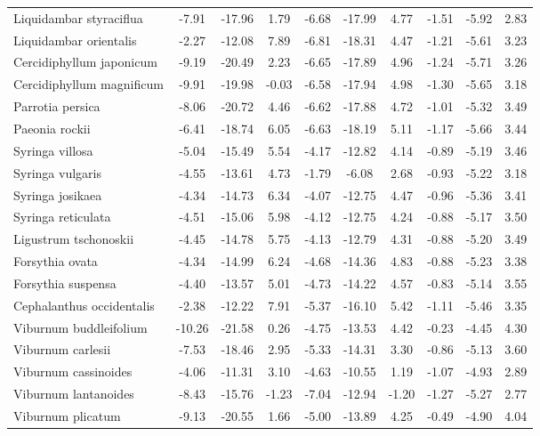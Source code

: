 \documentclass[11pt]{article}
\begin{document}
\begin{longtable}{p{1.50in}c{0.32in}c{0.32in}c{0.32in}c{0.32in}c{0.32in}c{0.32in}c{0.2in}c{0.3in}c{0.1in}}
  Liquidambar styraciflua & -7.91 & -17.96 & 1.79 & -6.68 & -17.99 & 4.77 & -1.51 & -5.92 & 2.83 \\ 
  Liquidambar orientalis & -2.27 & -12.08 & 7.89 & -6.81 & -18.31 & 4.47 & -1.21 & -5.61 & 3.23 \\ 
  Cercidiphyllum japonicum & -9.19 & -20.49 & 2.23 & -6.65 & -17.89 & 4.96 & -1.24 & -5.71 & 3.26 \\ 
  Cercidiphyllum magnificum & -9.91 & -19.98 & -0.03 & -6.58 & -17.94 & 4.98 & -1.30 & -5.65 & 3.18 \\ 
  Parrotia persica & -8.06 & -20.72 & 4.46 & -6.62 & -17.88 & 4.72 & -1.01 & -5.32 & 3.49 \\ 
  Paeonia rockii & -6.41 & -18.74 & 6.05 & -6.63 & -18.19 & 5.11 & -1.17 & -5.66 & 3.44 \\ 
  Syringa villosa & -5.04 & -15.49 & 5.54 & -4.17 & -12.82 & 4.14 & -0.89 & -5.19 & 3.46 \\ 
  Syringa vulgaris & -4.55 & -13.61 & 4.73 & -1.79 & -6.08 & 2.68 & -0.93 & -5.22 & 3.18 \\ 
  Syringa josikaea & -4.34 & -14.73 & 6.34 & -4.07 & -12.75 & 4.47 & -0.96 & -5.36 & 3.41 \\ 
  Syringa reticulata & -4.51 & -15.06 & 5.98 & -4.12 & -12.75 & 4.24 & -0.88 & -5.17 & 3.50 \\ 
  Ligustrum tschonoskii & -4.45 & -14.78 & 5.75 & -4.13 & -12.79 & 4.31 & -0.88 & -5.20 & 3.49 \\ 
  Forsythia ovata & -4.34 & -14.99 & 6.24 & -4.68 & -14.36 & 4.83 & -0.88 & -5.23 & 3.38 \\ 
  Forsythia suspensa & -4.40 & -13.57 & 5.01 & -4.73 & -14.22 & 4.57 & -0.83 & -5.14 & 3.55 \\ 
  Cephalanthus occidentalis & -2.38 & -12.22 & 7.91 & -5.37 & -16.10 & 5.42 & -1.11 & -5.46 & 3.35 \\ 
  Viburnum buddleifolium & -10.26 & -21.58 & 0.26 & -4.75 & -13.53 & 4.42 & -0.23 & -4.45 & 4.30 \\ 
  Viburnum carlesii & -7.53 & -18.46 & 2.95 & -5.33 & -14.31 & 3.30 & -0.86 & -5.13 & 3.60 \\ 
  Viburnum cassinoides & -4.06 & -11.31 & 3.10 & -4.63 & -10.55 & 1.19 & -1.07 & -4.93 & 2.89 \\ 
  Viburnum lantanoides & -8.43 & -15.76 & -1.23 & -7.04 & -12.94 & -1.20 & -1.27 & -5.27 & 2.77 \\ 
  Viburnum plicatum & -9.13 & -20.55 & 1.66 & -5.00 & -13.89 & 4.25 & -0.49 & -4.90 & 4.04 \\ 

\end{longtable}
\end{document}
